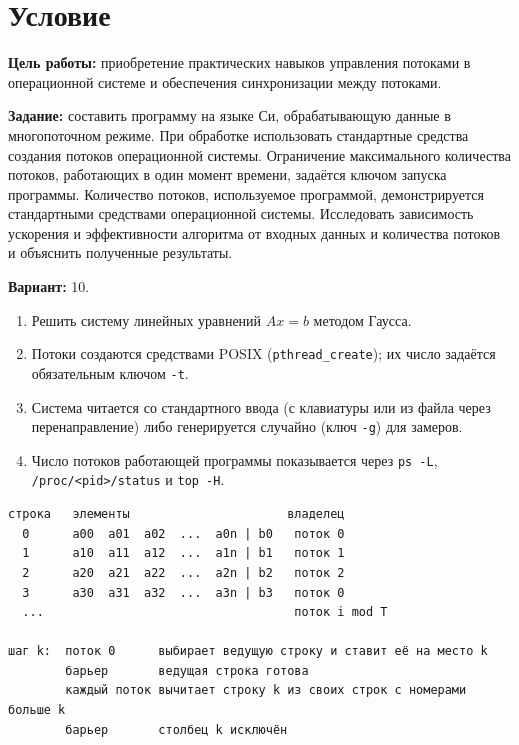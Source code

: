 \section{Условие}

{\bfseries Цель работы:} приобретение практических навыков управления потоками
в операционной системе и обеспечения синхронизации между потоками.

{\bfseries Задание:} составить программу на языке Си, обрабатывающую данные в
многопоточном режиме. При обработке использовать стандартные средства создания
потоков операционной системы. Ограничение максимального количества потоков,
работающих в один момент времени, задаётся ключом запуска программы.
Количество потоков, используемое программой, демонстрируется стандартными
средствами операционной системы. Исследовать зависимость ускорения и
эффективности алгоритма от входных данных и количества потоков и объяснить
полученные результаты.

{\bfseries Вариант:} 10.

\begin{enumerate}
  \item Решить систему линейных уравнений $Ax = b$ методом Гаусса.
  \item Потоки создаются средствами POSIX (\texttt{pthread\_create}); их число
        задаётся обязательным ключом \texttt{-t}.
  \item Система читается со стандартного ввода (с клавиатуры или из файла через
        перенаправление) либо генерируется случайно (ключ \texttt{-g}) для замеров.
  \item Число потоков работающей программы показывается через \texttt{ps -L},
        \texttt{/proc/<pid>/status} и \texttt{top -H}.
\end{enumerate}

\begin{lstlisting}[language={},title={Распределение строк расширенной матрицы $[A\,|\,b]$ между потоками ($T = 3$)}]
строка   элементы                      владелец
  0      a00  a01  a02  ...  a0n | b0   поток 0
  1      a10  a11  a12  ...  a1n | b1   поток 1
  2      a20  a21  a22  ...  a2n | b2   поток 2
  3      a30  a31  a32  ...  a3n | b3   поток 0
  ...                                   поток i mod T

шаг k:  поток 0      выбирает ведущую строку и ставит её на место k
        барьер       ведущая строка готова
        каждый поток вычитает строку k из своих строк с номерами больше k
        барьер       столбец k исключён
\end{lstlisting}
